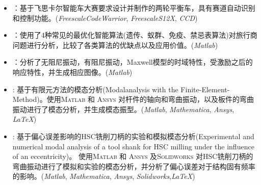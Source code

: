 \documentclass[zh]{resume}
\newcommand{\Matlab}{\textsc{Matlab}\textsuperscript{\textregistered} }
\newcommand{\Ansys}{\textsc{Ansys}\textsuperscript{\textregistered} }
\newcommand{\Solidworks}{\textsc{Solidworks}\textsuperscript{\textregistered} }
\begin{document}
\begin{itemize}
	\item {}：基于飞思卡尔智能车大赛要求设计并制作的两轮平衡车，具有赛道自动识别和控制功能。(\textit{Freescale\textregistered CodeWarrior}, \textit{Freescale\textregistered S12X}, \textit{CCD})
	
	\item 
	：使用了4种常见的最优化智能算法(遗传、蚁群、免疫、禁忌表算法)对旅行商问题进行分析，比较了各类算法的优缺点以及应用价值。(\textit{Matlab\textregistered})
	
	\item {}：分析了无阻尼振动，有阻尼振动，Maxwell模型的时域特性，受激励之后的响应特性，并生成相应图像。(\textit{Matlab\textregistered})
	
	\item 
	: 
	      基于有限元方法的模态分析(Modalanalysis with the Finite-Element-Method)。使用\Matlab 和 \Ansys 对杆件的轴向和弯曲振动，以及板件的弯曲振动进行了模态分析，并生成模态振型。(\textit{Matlab\textregistered}, \textit{Mathematica\textregistered}, \textit{Ansys\textregistered}, \textit{\LaTeX})
	
	\item 
	: 
	基于偏心误差影响的HSC铣削刀柄的实验和模拟模态分析(Experimental and numerical modal analysis of a tool shank for HSC milling under the influence of an eccentricity)。 使用\Matlab 和 \Ansys 及\Solidworks 对HSC铣削刀柄的弯曲振动进行了模拟和实验的模态分析，并分析了偏心误差对于结构固有频率的影响。(\textit{Matlab\textregistered}, \textit{Mathematica\textregistered}, \textit{Ansys\textregistered}, \textit{Solidworks\textregistered},\textit{\LaTeX})
  		
\end{itemize}

\clearpage
\end{document}
